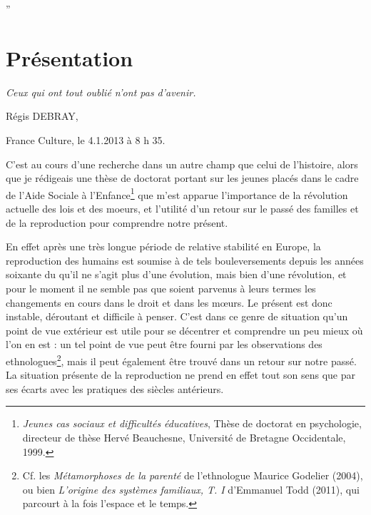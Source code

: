 

”\chapter{Présentation}

\emph{Ceux qui ont tout oublié n'ont pas d'avenir.}


Régis DEBRAY, 

France Culture, le 4.1.2013 à 8 h 35.






C'est au cours d'une recherche dans un autre champ que celui de l'histoire, alors que je rédigeais une thèse de doctorat portant sur les jeunes placés dans le cadre de l'Aide Sociale à l'Enfance\footnote{\emph{Jeunes cas sociaux et difficultés éducatives}, Thèse de doctorat en psychologie, directeur de thèse Hervé Beauchesne, Université de Bretagne Occidentale, 1999.} que m'est apparue l'importance de la révolution actuelle des lois et des moeurs, et l'utilité d'un retour sur le passé des familles et de la reproduction pour comprendre notre présent. 

En effet après une très longue période de relative stabilité en Europe, la reproduction des humains
est  soumise à de tels bouleversements depuis les années soixante du   
qu'il ne s'agit plus d'une évolution, mais bien d'une révolution, et pour le moment il
ne semble pas que soient parvenus à leurs termes les changements en
cours dans le droit et dans les mœurs. Le présent est donc instable, déroutant et difficile à penser. C'est dans ce genre de situation qu'un point de vue extérieur est utile pour se décentrer et comprendre un peu mieux où l'on en est : un tel point de vue peut être fourni par les observations des ethnologues\footnote{Cf. les \emph{Métamorphoses de la parenté} de l'ethnologue Maurice Godelier (2004), ou bien \emph{L'origine des systèmes familiaux, T. I} d'Emmanuel Todd (2011), qui parcourt à la fois l'espace et le temps.}, mais il peut également être trouvé dans un retour sur notre passé. La situation présente de la reproduction ne prend en effet tout son sens que par ses écarts avec les pratiques des siècles antérieurs.

